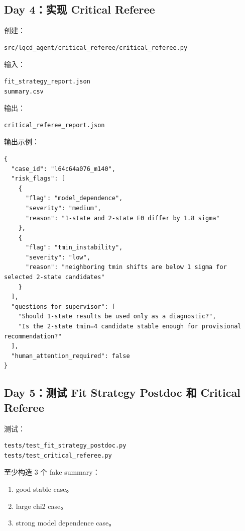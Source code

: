 \documentclass[11pt,a4paper,fontset=none]{ctexart}
\begin{document}
\subsection{Day 4：实现 Critical Referee}

创建：

\begin{lstlisting}
src/lqcd_agent/critical_referee/critical_referee.py
\end{lstlisting}

输入：

\begin{lstlisting}
fit_strategy_report.json
summary.csv
\end{lstlisting}

输出：

\begin{lstlisting}
critical_referee_report.json
\end{lstlisting}

输出示例：

\begin{lstlisting}
{
  "case_id": "l64c64a076_m140",
  "risk_flags": [
    {
      "flag": "model_dependence",
      "severity": "medium",
      "reason": "1-state and 2-state E0 differ by 1.8 sigma"
    },
    {
      "flag": "tmin_instability",
      "severity": "low",
      "reason": "neighboring tmin shifts are below 1 sigma for selected 2-state candidates"
    }
  ],
  "questions_for_supervisor": [
    "Should 1-state results be used only as a diagnostic?",
    "Is the 2-state tmin=4 candidate stable enough for provisional recommendation?"
  ],
  "human_attention_required": false
}
\end{lstlisting}

\subsection{Day 5：测试 Fit Strategy Postdoc 和 Critical Referee}

测试：

\begin{lstlisting}
tests/test_fit_strategy_postdoc.py
tests/test_critical_referee.py
\end{lstlisting}

至少构造 3 个 fake summary：

\begin{enumerate}[leftmargin=2em]
  \item good stable case。
  \item large chi2 case。
  \item strong model dependence case。
\end{enumerate}
\end{document}
